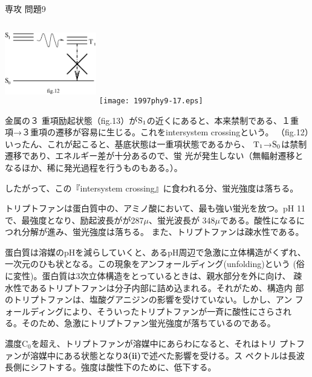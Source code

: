 \documentclass[fleqn]{jbook}
\begin{document}
\begin{answer}{専攻 問題9}{}
\begin{subanswers}
\begin{subsubanswers}
\SubSubAnswer
\parbox[t]{90mm}{
\begin{center}
\includegraphics[clip,height=35mm,width=40mm]{1997phy9-16.eps}
\texttt{[image: 1997phy9-17.eps]}
\end{center}}\parbox[t]{70mm}{金属の３
重項励起状態（fig.13）が$\rm{S_1}$の近くにあると、本来禁制である、１重
項→３重項の遷移が容易に生じる。これをintersystem crossingという。
（fig.12）いったん、これが起こると、基底状態は一重項状態であるから、
$\rm{T_1}$→$\rm{S_0}$は禁制遷移であり、エネルギー差が十分あるので、蛍
光が発生しない（無輻射遷移となるほか、稀に発光過程を行うものもある。）。}

したがって、この『intersystem crossing』に食われる分、蛍光強度は落ちる。
\end{subsubanswers}

\SubAnswer
トリプトファンは蛋白質中の、アミノ酸において、最も強い蛍光を放つ。pH
11 で、最強度となり、励起波長がが287$\mu$、蛍光波長が
348$\mu$である。酸性になるにつれ分解が進み、蛍光強度は落ちる。
また、トリプトファンは疎水性である。
\begin{subsubanswers}
\SubSubAnswer

蛋白質は溶媒のpHを減らしていくと、あるpH周辺で急激に立体構造がくずれ、
一次元のひも状となる。この現象をアンフォールディング(unfolding)という
(俗に変性)。蛋白質は3次立体構造をとっているときは、親水部分を外に向け、
疎水性であるトリプトファンは分子内部に詰め込まれる。それがため、構造内
部のトリプトファンは、塩酸グアニジンの影響を受けていない。しかし、アン
フォールディングにより、そういったトリプトファンが一斉に酸性にさらされ
る。そのため、急激にトリプトファン蛍光強度が落ちているのである。

\SubSubAnswer

濃度C${}_0$を超え、トリプトファンが溶媒中にあらわになると、それはトリ
プトファンが溶媒中にある状態となり{\bf{3(ii)}}で述べた影響を受ける。ス
ペクトルは長波長側にシフトする。強度は酸性下のために、低下する。

\end{subsubanswers}
\end{subanswers}
\end{answer}
\end{document}
